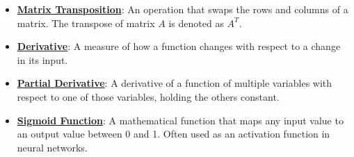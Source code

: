 \documentclass{article}%
\begin{document}
\begin{itemize}[leftmargin=*]
\item \href{https://purdue.brightspace.com/d2l/common/assets/pdfjs-d2l-dist/1.0.14-legacy/web/viewer.html?file=%2Fcontent%2Fenforced%2F1095467-wl.202510.CS.24300.001%2F04L1-Linear Algebra Primer.pdf%3Fou%3D1095467&lang=en-us&container=d2l-fileviewer-rendered-pdf&fullscreen=d2l-fileviewer-rendered-pdf-dialog&height=667#page=16}{\textbf{Matrix Transposition}}: An operation that swaps the rows and columns of a matrix. The transpose of matrix $A$ is denoted as $A^T$.%
\item \href{https://purdue.brightspace.com/d2l/common/assets/pdfjs-d2l-dist/1.0.14-legacy/web/viewer.html?file=%2Fcontent%2Fenforced%2F1095467-wl.202510.CS.24300.001%2F04L1-Linear Algebra Primer.pdf%3Fou%3D1095467&lang=en-us&container=d2l-fileviewer-rendered-pdf&fullscreen=d2l-fileviewer-rendered-pdf-dialog&height=667#page=21}{\textbf{Derivative}}: A measure of how a function changes with respect to a change in its input.%
\item \href{https://purdue.brightspace.com/d2l/common/assets/pdfjs-d2l-dist/1.0.14-legacy/web/viewer.html?file=%2Fcontent%2Fenforced%2F1095467-wl.202510.CS.24300.001%2F04L1-Linear Algebra Primer.pdf%3Fou%3D1095467&lang=en-us&container=d2l-fileviewer-rendered-pdf&fullscreen=d2l-fileviewer-rendered-pdf-dialog&height=667#page=19}{\textbf{Partial Derivative}}: A derivative of a function of multiple variables with respect to one of those variables, holding the others constant.%
\item \href{https://purdue.brightspace.com/d2l/common/assets/pdfjs-d2l-dist/1.0.14-legacy/web/viewer.html?file=%2Fcontent%2Fenforced%2F1095467-wl.202510.CS.24300.001%2F04L1-Linear Algebra Primer.pdf%3Fou%3D1095467&lang=en-us&container=d2l-fileviewer-rendered-pdf&fullscreen=d2l-fileviewer-rendered-pdf-dialog&height=667#page=21}{\textbf{Sigmoid Function}}: A mathematical function that maps any input value to an output value between 0 and 1. Often used as an activation function in neural networks.%
\end{itemize}%
\end{document}
